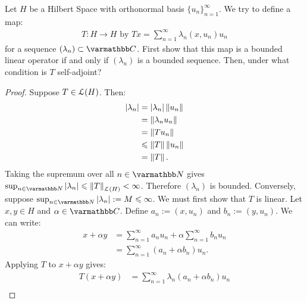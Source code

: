 \begin{exercise}
Let $H$ be a Hilbert Space with orthonormal basis $\{u_n\}_{n = 1}^\infty$. We try to define a map:
    \begin{equation*}
    \begin{split}
        T:H \rightarrow H \text{ by }Tx = \sum_{n = 1}^\infty \lambda_n (x,u_n)u_n
    \end{split}
    \end{equation*}
for a sequence $(\lambda_n) \subset \bfC$. First show that this map is a bounded linear operator if and only if $(\lambda_n)$ is a bounded sequence. Then, under what condition is $T$ self-adjoint?
\end{exercise}
\begin{proof}
    Suppose $T \in \mathcal{L}(H)$. Then:
        \begin{equation*}
        \begin{split}
            |\lambda_n| 
            & = |\lambda_n| \left\lVert u_n \right\rVert \\
            & = \left\lVert \lambda_n u_n \right\rVert \\
            & = \left\lVert T u_n \right\rVert \\
            & \leqslant \left\lVert T \right\rVert \left\lVert u_n \right\rVert \\
            & = \left\lVert T \right\rVert.
        \end{split}
        \end{equation*}
    Taking the supremum over all $n \in \bfN$ gives $\sup_{n \in \bfN}|\lambda_n| \leq \lnorm T \rnorm_{\cL(H)} < \infty$. Therefore $(\lambda_n)$ is bounded. Conversely, suppose $\sup_{n \in \bfN}|\lambda_n| := M \leq \infty$. We must first show that $T$ is linear. Let $x,y \in H$ and $\alpha \in \bfC$. Define $a_n := (x,u_n)$ and $b_n := (y,u_n)$. We can write:
        \begin{equation*}
        \begin{split}
            x + \alpha y 
            & = \sum_{n = 1}^\infty a_n u_n + \alpha \sum_{n = 1}^\infty b_n u_n \\
            & = \sum_{n = 1}^\infty (a_n + \alpha b_n)u_n.
        \end{split}
        \end{equation*}
    Applying $T$ to $x+\alpha y$ gives:
        \begin{equation*}
        \begin{split}
            T(x+\alpha y) 
            & = \sum_{n = 1}^\infty \lambda_n (a_n + \alpha b_n)u_n \\

\end{split}
\end{equation*}
\end{proof}
